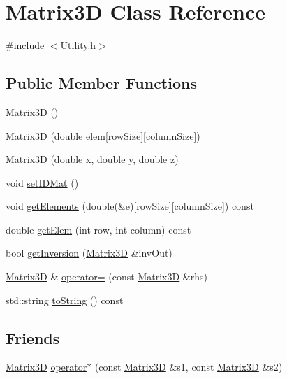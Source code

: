 \hypertarget{class_matrix3_d}{\section{Matrix3\-D Class Reference}
\label{class_matrix3_d}
}


{\ttfamily \#include $<$Utility.\-h$>$}

\subsection*{Public Member Functions}
\begin{DoxyCompactItemize}
\item 
\hyperlink{class_matrix3_d_afe9c6b7abe858fe9f6aea8f0607a00a7}{Matrix3\-D} ()
\item 
\hyperlink{class_matrix3_d_a3815dcfb26b7124d89a5c9f6b166ff5f}{Matrix3\-D} (double elem\mbox{[}row\-Size\mbox{]}\mbox{[}column\-Size\mbox{]})
\item 
\hyperlink{class_matrix3_d_a41fbb4c0c742c10a21343486a42a0e56}{Matrix3\-D} (double x, double y, double z)
\item 
void \hyperlink{class_matrix3_d_aec51075342822cfb4a2356ad6b970153}{set\-I\-D\-Mat} ()
\item 
void \hyperlink{class_matrix3_d_a6d9200e3ad1f997cb1bebcc9277f2b41}{get\-Elements} (double(\&e)\mbox{[}row\-Size\mbox{]}\mbox{[}column\-Size\mbox{]}) const 
\item 
double \hyperlink{class_matrix3_d_af226f6ecbf1240a56bd7f00c2a54f530}{get\-Elem} (int row, int column) const 
\item 
bool \hyperlink{class_matrix3_d_a0260b566bbd5579a3a2c393ef9c09eb0}{get\-Inversion} (\hyperlink{class_matrix3_d}{Matrix3\-D} \&inv\-Out)
\item 
\hyperlink{class_matrix3_d}{Matrix3\-D} \& \hyperlink{class_matrix3_d_a8049b657a2c0a150f95194a75e90789c}{operator=} (const \hyperlink{class_matrix3_d}{Matrix3\-D} \&rhs)
\item 
std\-::string \hyperlink{class_matrix3_d_a3f99e2bf75e31b08646b79b2c9756d14}{to\-String} () const 
\end{DoxyCompactItemize}
\subsection*{Friends}
\begin{DoxyCompactItemize}
\item 
\hyperlink{class_matrix3_d}{Matrix3\-D} \hyperlink{class_matrix3_d_a8aeebbc7c89ec0a85a08aee0d87c6aae}{operator$\ast$} (const \hyperlink{class_matrix3_d}{Matrix3\-D} \&s1, const \hyperlink{class_matrix3_d}{Matrix3\-D} \&s2)
\end{DoxyCompactItemize}


